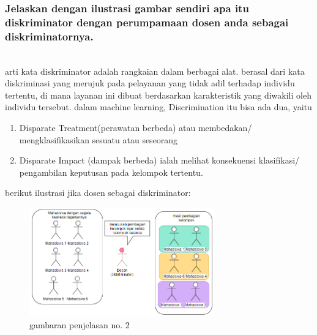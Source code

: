 \subsubsection{Jelaskan dengan ilustrasi gambar sendiri apa itu diskriminator dengan perumpamaan dosen anda sebagai diskriminatornya.}
\hfill\\
arti kata diskriminator adalah rangkaian dalam berbagai alat. berasal dari kata diskriminasi yang merujuk pada pelayanan yang tidak adil terhadap individu tertentu, di mana layanan ini dibuat berdasarkan karakteristik yang diwakili oleh individu tersebut. dalam machine learning, Discrimination itu bisa ada dua, yaitu
\begin{enumerate}
\item Disparate Treatment(perawatan berbeda) atau membedakan/ mengklasifikasikan sesuatu atau seseorang
\item Disparate Impact (dampak berbeda) ialah melihat konsekuensi klasifikasi/ pengambilan keputusan pada kelompok tertentu.
\end{enumerate}
berikut ilustrasi jika dosen sebagai diskriminator:
\begin{figure}[H]
	\centering
	\includegraphics[width=8cm]{figures/1174083/figures8/2.png}
	\caption{gambaran penjelasan no. 2}
\end{figure}

